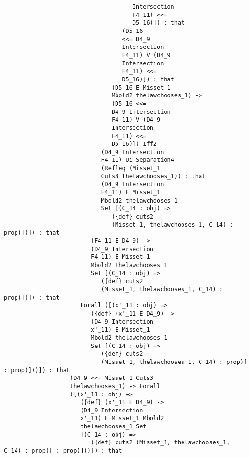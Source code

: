 \documentclass[12pt]{article}
\begin{document}
\begin{verbatim}
                                     Intersection 
                                     F4_11) <<= 
                                     D5_16)]) : that 
                                  (D5_16 
                                  <<= D4_9 
                                  Intersection 
                                  F4_11) V (D4_9 
                                  Intersection 
                                  F4_11) <<= 
                                  D5_16)]) : that 
                               (D5_16 E Misset_1 
                               Mbold2 thelawchooses_1) -> 
                               (D5_16 <<= 
                               D4_9 Intersection 
                               F4_11) V (D4_9 
                               Intersection 
                               F4_11) <<= 
                               D5_16)]) Iff2 
                            (D4_9 Intersection 
                            F4_11) Ui Separation4 
                            (Refleq (Misset_1 
                            Cuts3 thelawchooses_1)) : that 
                            (D4_9 Intersection 
                            F4_11) E Misset_1 
                            Mbold2 thelawchooses_1 
                            Set [(C_14 : obj) => 
                               ({def} cuts2 
                               (Misset_1, thelawchooses_1, C_14) : prop)])]) : that 
                         (F4_11 E D4_9) -> 
                         (D4_9 Intersection 
                         F4_11) E Misset_1 
                         Mbold2 thelawchooses_1 
                         Set [(C_14 : obj) => 
                            ({def} cuts2 
                            (Misset_1, thelawchooses_1, C_14) : prop)])]) : that 
                      Forall ([(x'_11 : obj) => 
                         ({def} (x'_11 E D4_9) -> 
                         (D4_9 Intersection 
                         x'_11) E Misset_1 
                         Mbold2 thelawchooses_1 
                         Set [(C_14 : obj) => 
                            ({def} cuts2 
                            (Misset_1, thelawchooses_1, C_14) : prop)] : prop)]))]) : that 
                   (D4_9 <<= Misset_1 Cuts3 
                   thelawchooses_1) -> Forall 
                   ([(x'_11 : obj) => 
                      ({def} (x'_11 E D4_9) -> 
                      (D4_9 Intersection 
                      x'_11) E Misset_1 Mbold2 
                      thelawchooses_1 Set 
                      [(C_14 : obj) => 
                         ({def} cuts2 (Misset_1, thelawchooses_1, C_14) : prop)] : prop)]))]) : that 

\end{verbatim}
\end{document}

